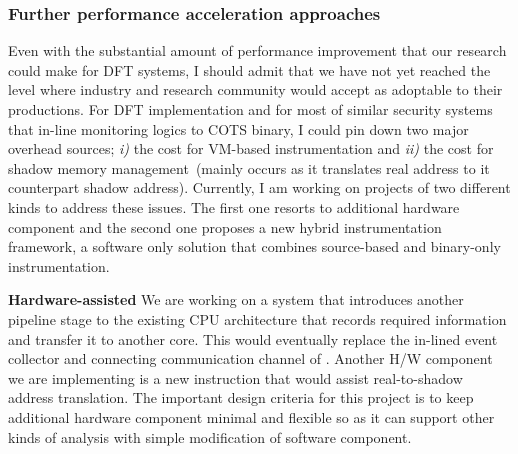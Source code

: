 \documentclass[letterpaper, 10pt]{article}
\begin{document}
\begin{small}
\subsubsection*{Further performance acceleration approaches}
%
Even with the substantial amount of performance improvement that our research
could make for DFT systems, I should admit that we have not yet reached the
level where industry and research community would accept as adoptable to their
productions.
%
For DFT implementation and for most of similar security systems that in-line
monitoring logics to COTS binary, I could pin down two major overhead sources;
{\it i)} the cost for VM-based instrumentation and {\it ii)} the cost for
shadow memory management~(mainly occurs as it translates real address to it
counterpart shadow address).
%
Currently, I am working on projects of two different kinds to address these
issues. The first one resorts to additional hardware component and the second
one proposes a new hybrid instrumentation framework, a software only solution
that combines source-based and binary-only instrumentation.

{\bf Hardware-assisted \SR} 
%
%
We are working on a system that introduces another pipeline stage to the
existing CPU architecture that records required information and transfer it to
another core. This would eventually replace the in-lined event collector and
connecting communication channel of \SR. Another H/W component we are
implementing is a new instruction that would assist real-to-shadow address
translation. The important design criteria for this project is to keep
additional hardware component minimal and flexible so as it can support other
kinds of analysis with simple modification of software component.


\end{small}
\end{document}
